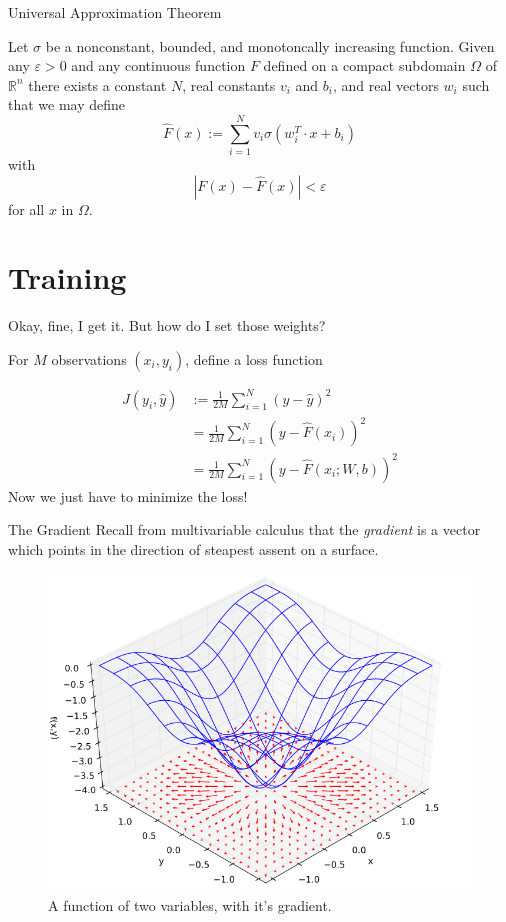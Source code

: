 \documentclass[11pt]{beamer}
\let\epsilon=\varepsilon
\newcommand{\R}{\mathbb{R}}
\begin{document}
\begin{frame}{Universal Approximation Theorem}
\begin{theorem}
Let $\sigma$ be a nonconstant, bounded, and monotoncally increasing function.
Given any $\epsilon > 0$ and any continuous function $F$ defined on a compact subdomain $\Omega$ of $\R^n$ there exists a constant $N$, real constants $v_i$ and $b_i$, and real vectors $w_i$ such that we may define
$$\widehat{F}(x) := \sum_{i = 1}^N v_i \sigma(w_i^T \cdot x + b_i)$$
with
$$\left|F(x) - \widehat{F}(x)\right| < \epsilon$$
for all $x$ in $\Omega$.
\end{theorem}
\end{frame}

\section{Training}
\begin{frame}{Okay, fine, I get it. But how do I set those weights?}

For $M$ observations $(x_i, y_i)$, define a loss function

\begin{align*}
J(y_i, \widehat{y}) &:= \frac{1}{2M}\sum_{i =1}^N (y - \widehat{y})^2 \\
&= \frac{1}{2M}\sum_{i =1}^N \left(y - \widehat{F}(x_i)\right)^2 \\
&= \frac{1}{2M}\sum_{i =1}^N \left(y - \widehat{F}(x_i; W, b)\right)^2 
\end{align*}
Now we just have to minimize the loss!
\end{frame}

\begin{frame}{The Gradient}
Recall from multivariable calculus that the \emph{gradient} is a vector which points in the direction of steapest assent on a surface.
\begin{center}
\begin{figure}
\includegraphics[scale=0.25]{720px-Gradient_Visual}
\caption{A function of two variables, with it's gradient.}
\end{figure}
\end{center}
\end{frame}
\end{document}
